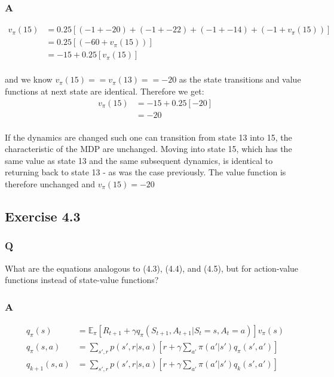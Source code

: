 \subsubsection{A}
\begin{align}
v_\pi(15) &= 0.25 \left[(-1 + -20) + (-1 + -22) + (-1 + -14) + (-1 + v_\pi(15)) \right] \\
&= 0.25 \left[(-60 + v_\pi(15)) \right] \\
&= -15 + 0.25 \left[v_\pi(15) \right] \\
\end{align}

and we know $v_\pi(15) == v_\pi(13) == -20$ as the state transitions and value functions at next state are identical. Therefore we get:
\begin{align}
v_\pi(15) &= -15 + 0.25 \left[-20\right] \\
&= -20 \\
\end{align}

If the dynamics are changed such one can transition from state 13 into 15, the characteristic of the MDP are unchanged. Moving into state 15, which has the same value as state 13 and the same subsequent dynamics, is identical to returning back to state 13 - as was the case previously. The value function is therefore unchanged and $v_\pi(15) = -20$

\subsection*{Exercise 4.3}
\subsubsection{Q}
What are the equations analogous to (4.3), (4.4), and (4.5), but for action-value functions instead of state-value functions?
\subsubsection{A}
\begin{align}
q_\pi(s) &= \mathbb{E}_\pi \left[R_{t+1} + \gamma q_\pi(S_{t+1}, A_{t+1} | S_t = s, A_t = a)\right]v_\pi(s) \\
q_\pi(s,a) &= \sum_{s',r} p(s', r | s, a) \left[r + \gamma \sum_{a'} \pi(a' | s') q_\pi(s', a')\right] \\
q_{k+1}(s,a) &= \sum_{s',r} p(s', r | s, a) \left[r + \gamma \sum_{a'} \pi(a' | s') q_k(s', a')\right] \\
\end{align}

